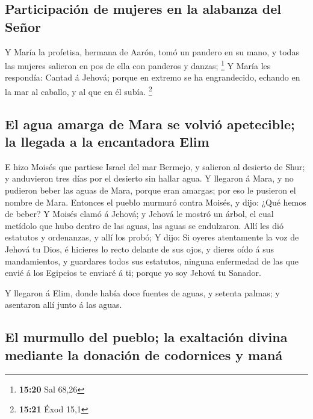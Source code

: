 \hypertarget{participaciuxf3n-de-mujeres-en-la-alabanza-del-seuxf1or}{%
\subsection{Participación de mujeres en la alabanza del
Señor}\label{participaciuxf3n-de-mujeres-en-la-alabanza-del-seuxf1or}}

 Y María la profetisa, hermana de Aarón, tomó un pandero en
su mano, y todas las mujeres salieron en pos de ella con panderos y
danzas; \footnote{\textbf{15:20} Sal 68,26}  Y María les
respondía: Cantad á Jehová; porque en extremo se ha engrandecido,
echando en la mar al caballo, y al que en él subía. \footnote{\textbf{15:21}
  Éxod 15,1}

\hypertarget{el-agua-amarga-de-mara-se-volviuxf3-apetecible-la-llegada-a-la-encantadora-elim}{%
\subsection{El agua amarga de Mara se volvió apetecible; la llegada a la
encantadora
Elim}\label{el-agua-amarga-de-mara-se-volviuxf3-apetecible-la-llegada-a-la-encantadora-elim}}

 E hizo Moisés que partiese Israel del mar Bermejo, y
salieron al desierto de Shur; y anduvieron tres días por el desierto sin
hallar agua.  Y llegaron á Mara, y no pudieron beber las
aguas de Mara, porque eran amargas; por eso le pusieron el nombre de
Mara.  Entonces el pueblo murmuró contra Moisés, y dijo:
¿Qué hemos de beber?  Y Moisés clamó á Jehová; y Jehová le
mostró un árbol, el cual metídolo que hubo dentro de las aguas, las
aguas se endulzaron. Allí les dió estatutos y ordenanzas, y allí los
probó;  Y dijo: Si oyeres atentamente la voz de Jehová tu
Dios, é hicieres lo recto delante de sus ojos, y dieres oído á sus
mandamientos, y guardares todos sus estatutos, ninguna enfermedad de las
que envié á los Egipcios te enviaré á ti; porque yo soy Jehová tu
Sanador.

 Y llegaron á Elim, donde había doce fuentes de aguas, y
setenta palmas; y asentaron allí junto á las aguas.

\hypertarget{el-murmullo-del-pueblo-la-exaltaciuxf3n-divina-mediante-la-donaciuxf3n-de-codornices-y-manuxe1}{%
\subsection{El murmullo del pueblo; la exaltación divina mediante la
donación de codornices y
maná}\label{el-murmullo-del-pueblo-la-exaltaciuxf3n-divina-mediante-la-donaciuxf3n-de-codornices-y-manuxe1}}

